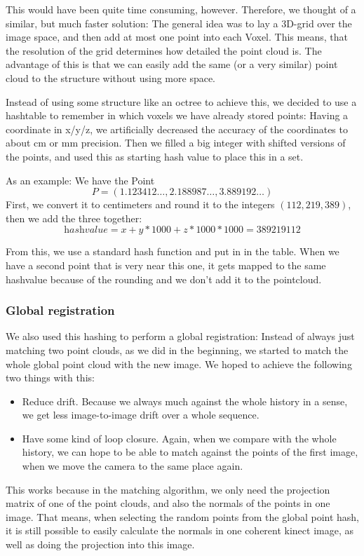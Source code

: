 \documentclass[10pt,twocolumn,letterpaper]{article}
\begin{document}
This would have been quite time consuming, however. Therefore, we thought of a similar, but much faster solution:
The general idea was to lay a 3D-grid over the image space, and then add at most one point into each Voxel. This means, that the resolution
of the grid determines how detailed the point cloud is. The advantage of this is that we can easily add the same (or a very similar) point cloud
to the structure without using more space.

Instead of using some structure like an octree to achieve this, we decided to use a hashtable to remember in which voxels we have already stored points:
Having a coordinate in x/y/z, we artificially decreased the accuracy of the coordinates to about cm or mm precision. Then we filled a big integer with
shifted versions of the points, and used this as starting hash value to place this in a set.

As an example: We have the Point
$$P = (1.123412\ldots, 2.188987\ldots, 3.889192\ldots)$$
First, we convert it to centimeters and round it to the integers $(112, 219, 389)$, then we add the three together:
$$\textit{hashvalue} = x + y*1000 + z*1000*1000 = 389 219 112$$

From this, we use a standard hash function and put in in the table. When we have a second
point that is very near this one, it gets mapped to the same hashvalue because of the rounding and we don't add it to the pointcloud.

\subsubsection{Global registration}
We also used this hashing to perform a global registration: Instead of always just matching two point clouds, as we did in the beginning, we started
to match the whole global point cloud with the new image. We hoped to achieve the following two things with this:
\begin{itemize}
\item Reduce drift. Because we always much against the whole history in a sense, we get less image-to-image drift over a whole sequence.
\item Have some kind of loop closure. Again, when we compare with the whole history, we can hope to be able to match against
the points of the first image, when we move the camera to the same place again.
\end{itemize}

This works because in the matching algorithm, we only need the projection matrix of
one of the point clouds, and also the normals of the points in one image. That means, when selecting the random points from the global point hash, it is
still possible to easily calculate the normals in one coherent kinect image, as well as doing the projection into this image.
\end{document}
